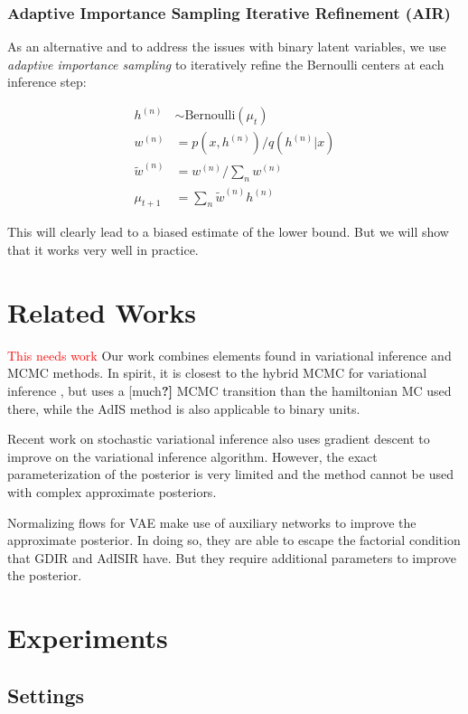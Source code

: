\documentclass{article} %
\newcommand{\alert}[1]{\textcolor{red}{#1}}
\newcommand{\Bernoulli}{\text{Bernoulli}}
\begin{document}
\subsubsection{Adaptive Importance Sampling Iterative Refinement (AIR)}
As an alternative and to address the issues with binary latent variables, we use \emph{adaptive importance sampling} \citep{karamchandani1989adaptive} to iteratively refine the Bernoulli centers at each inference step:

\begin{align}
    h^{(n)} &\sim \Bernoulli(\mu_t) \nonumber \\
w^{(n)} &= p(x, h^{(n)}) / q(h^{(n)} | x) \nonumber \\
\tilde{w}^{(n)} &= w^{(n)} / \sum_n w^{(n)} \nonumber \\
\mu_{t+1} &= \sum_n \tilde{w}^{(n)} h^{(n)}
\end{align}

This will clearly lead to a biased estimate of the lower bound. But we will show that it works very well in practice.

\section{Related Works}
\alert{This needs work}
Our work combines elements found in variational inference and MCMC methods. In spirit, it is closest to the hybrid MCMC for variational inference \citep{salimans2014markov}, but uses a [much\textbf{?]} MCMC transition than the hamiltonian MC used there, while the AdIS method is also applicable to binary units.

Recent work on stochastic variational inference \cite{hoffman2013stochastic} also uses gradient descent to improve on the variational inference algorithm. However, the exact parameterization of the posterior is very limited and the method cannot be used with complex approximate posteriors. 

Normalizing flows for VAE \citep{rezende2015variational} make use of auxiliary networks to improve the approximate posterior. In doing so, they are able to escape the factorial condition that GDIR and AdISIR have. But they require additional parameters to improve the posterior.

\section{Experiments}

\subsection{Settings}
\end{document}
